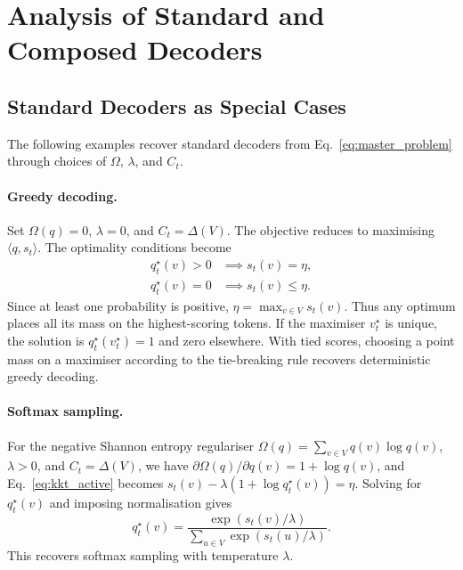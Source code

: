 \documentclass{article} %
\begin{document}
\section{Analysis of Standard and Composed Decoders}


\subsection{Standard Decoders as Special Cases}
\label{app:decoder_examples}

The following examples recover standard decoders from
Eq.~\ref{eq:master_problem} through choices of $\Omega$, $\lambda$, and $C_t$.

\paragraph{Greedy decoding.}
Set $\Omega(q)=0$, $\lambda=0$, and $C_t=\Delta(V)$.
The objective reduces to maximising $\langle q,s_t\rangle$.
The optimality conditions become
\begin{equation}
\begin{aligned}
q_t^\star(v)>0 &\implies s_t(v)=\eta,\\
q_t^\star(v)=0 &\implies s_t(v)\leq\eta.
\end{aligned}
\end{equation}
Since at least one probability is positive,
$\eta=\max_{v\in V}s_t(v)$.
Thus any optimum places all its mass on the highest-scoring tokens.
If the maximiser $v_t^\star$ is unique, the solution is
$q_t^\star(v_t^\star)=1$ and zero elsewhere.
With tied scores, choosing a point mass on a maximiser
according to the tie-breaking rule recovers deterministic
greedy decoding.

\paragraph{Softmax sampling.}
For the negative Shannon entropy regulariser
$\Omega(q)=\sum_{v\in V}q(v)\log q(v)$, $\lambda>0$, and $C_t=\Delta(V)$,
we have $\partial\Omega(q)/\partial q(v)=1+\log q(v)$, and Eq.~\ref{eq:kkt_active} becomes
$s_t(v)-\lambda(1+\log q_t^\star(v))=\eta$.
Solving for $q_t^\star(v)$ and imposing normalisation gives
\begin{equation}
q_t^\star(v)
=
\frac{\exp(s_t(v)/\lambda)}
{\sum_{u\in V}\exp(s_t(u)/\lambda)}.
\label{eq:softmax_example}
\end{equation}
This recovers softmax sampling with temperature $\lambda$.
\end{document}
